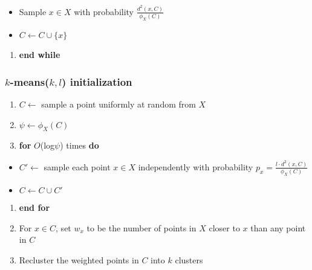 \documentclass{article}
\begin{document}
\begin{itemize}
\itemsep1pt\parskip0pt
\item
  Sample \(x \in X\) with probability \(\frac{d^2(x,C)}{\phi_X(C)}\)
\item
  \(C \leftarrow C \cup \{x\}\)
\end{itemize}

\begin{enumerate}
\def\labelenumi{\arabic{enumi}.}
\setcounter{enumi}{2}
\itemsep1pt\parskip0pt
\item
  \textbf{end while}
\end{enumerate}

\subsubsection{\texorpdfstring{\(k\)-means\textbar{}\textbar{}(\(k,l\))
initialization}{k-means\textbar{}\textbar{}(k,l) initialization}}\label{k-meanskl-initialization}

\begin{enumerate}
\def\labelenumi{\arabic{enumi}.}
\itemsep1pt\parskip0pt
\item
  \(C \leftarrow\) sample a point uniformly at random from \(X\)
\item
  \(\psi \leftarrow \phi_X(C)\)
\item
  \textbf{for} \(O\)(log\(\psi\)) times \textbf{do}
\end{enumerate}

\begin{itemize}
\itemsep1pt\parskip0pt
\item
  \(C' \leftarrow\) sample each point \(x \in X\) independently with
  probability \(p_x = \frac{l \cdot d^2(x,C)}{\phi_X(C)}\)\\
\item
  \(C \leftarrow C \cup C'\)
\end{itemize}

\begin{enumerate}
\def\labelenumi{\arabic{enumi}.}
\setcounter{enumi}{3}
\itemsep1pt\parskip0pt
\item
  \textbf{end for}
\item
  For \(x \in C\), set \(w_x\) to be the number of points in \(X\)
  closer to \(x\) than any point in \(C\)
\item
  Recluster the weighted points in \(C\) into \(k\) clusters
\end{enumerate}
\end{document}
